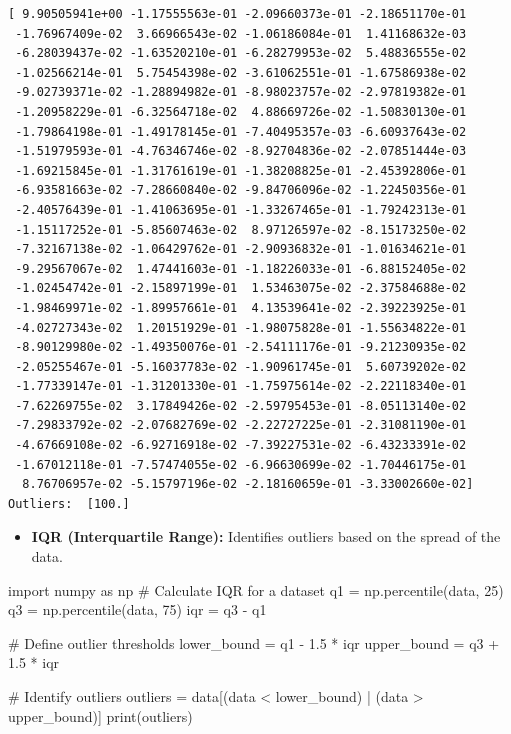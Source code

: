 \documentclass[
  letterpaper,
  DIV=11,
  numbers=noendperiod]{scrreprt}
\newenvironment{Shaded}{\begin{snugshade}}{\end{snugshade}}
\newcommand{\BuiltInTok}[1]{\textcolor[rgb]{0.00,0.23,0.31}{#1}}
\newcommand{\CommentTok}[1]{\textcolor[rgb]{0.37,0.37,0.37}{#1}}
\newcommand{\DecValTok}[1]{\textcolor[rgb]{0.68,0.00,0.00}{#1}}
\newcommand{\FloatTok}[1]{\textcolor[rgb]{0.68,0.00,0.00}{#1}}
\newcommand{\ImportTok}[1]{\textcolor[rgb]{0.00,0.46,0.62}{#1}}
\newcommand{\NormalTok}[1]{\textcolor[rgb]{0.00,0.23,0.31}{#1}}
\newcommand{\OperatorTok}[1]{\textcolor[rgb]{0.37,0.37,0.37}{#1}}
\providecommand{\tightlist}{%
  \setlength{\itemsep}{0pt}\setlength{\parskip}{0pt}}\usepackage{longtable,booktabs,array}
\begin{document}
\begin{verbatim}
[ 9.90505941e+00 -1.17555563e-01 -2.09660373e-01 -2.18651170e-01
 -1.76967409e-02  3.66966543e-02 -1.06186084e-01  1.41168632e-03
 -6.28039437e-02 -1.63520210e-01 -6.28279953e-02  5.48836555e-02
 -1.02566214e-01  5.75454398e-02 -3.61062551e-01 -1.67586938e-02
 -9.02739371e-02 -1.28894982e-01 -8.98023757e-02 -2.97819382e-01
 -1.20958229e-01 -6.32564718e-02  4.88669726e-02 -1.50830130e-01
 -1.79864198e-01 -1.49178145e-01 -7.40495357e-03 -6.60937643e-02
 -1.51979593e-01 -4.76346746e-02 -8.92704836e-02 -2.07851444e-03
 -1.69215845e-01 -1.31761619e-01 -1.38208825e-01 -2.45392806e-01
 -6.93581663e-02 -7.28660840e-02 -9.84706096e-02 -1.22450356e-01
 -2.40576439e-01 -1.41063695e-01 -1.33267465e-01 -1.79242313e-01
 -1.15117252e-01 -5.85607463e-02  8.97126597e-02 -8.15173250e-02
 -7.32167138e-02 -1.06429762e-01 -2.90936832e-01 -1.01634621e-01
 -9.29567067e-02  1.47441603e-01 -1.18226033e-01 -6.88152405e-02
 -1.02454742e-01 -2.15897199e-01  1.53463075e-02 -2.37584688e-02
 -1.98469971e-02 -1.89957661e-01  4.13539641e-02 -2.39223925e-01
 -4.02727343e-02  1.20151929e-01 -1.98075828e-01 -1.55634822e-01
 -8.90129980e-02 -1.49350076e-01 -2.54111176e-01 -9.21230935e-02
 -2.05255467e-01 -5.16037783e-02 -1.90961745e-01  5.60739202e-02
 -1.77339147e-01 -1.31201330e-01 -1.75975614e-02 -2.22118340e-01
 -7.62269755e-02  3.17849426e-02 -2.59795453e-01 -8.05113140e-02
 -7.29833792e-02 -2.07682769e-02 -2.22727225e-01 -2.31081190e-01
 -4.67669108e-02 -6.92716918e-02 -7.39227531e-02 -6.43233391e-02
 -1.67012118e-01 -7.57474055e-02 -6.96630699e-02 -1.70446175e-01
  8.76706957e-02 -5.15797196e-02 -2.18160659e-01 -3.33002660e-02]
Outliers:  [100.]
\end{verbatim}

\begin{itemize}
\tightlist
\item
  \textbf{IQR (Interquartile Range):} Identifies outliers based on the
  spread of the data.
\end{itemize}

\begin{Shaded}
\begin{Highlighting}[]
\ImportTok{import}\NormalTok{ numpy }\ImportTok{as}\NormalTok{ np}
\CommentTok{\# Calculate IQR for a dataset}
\NormalTok{q1 }\OperatorTok{=}\NormalTok{ np.percentile(data, }\DecValTok{25}\NormalTok{)}
\NormalTok{q3 }\OperatorTok{=}\NormalTok{ np.percentile(data, }\DecValTok{75}\NormalTok{)}
\NormalTok{iqr }\OperatorTok{=}\NormalTok{ q3 }\OperatorTok{{-}}\NormalTok{ q1}

\CommentTok{\# Define outlier thresholds}
\NormalTok{lower\_bound }\OperatorTok{=}\NormalTok{ q1 }\OperatorTok{{-}} \FloatTok{1.5} \OperatorTok{*}\NormalTok{ iqr}
\NormalTok{upper\_bound }\OperatorTok{=}\NormalTok{ q3 }\OperatorTok{+} \FloatTok{1.5} \OperatorTok{*}\NormalTok{ iqr}

\CommentTok{\# Identify outliers}
\NormalTok{outliers }\OperatorTok{=}\NormalTok{ data[(data }\OperatorTok{\textless{}}\NormalTok{ lower\_bound) }\OperatorTok{|}\NormalTok{ (data }\OperatorTok{\textgreater{}}\NormalTok{ upper\_bound)]}
\BuiltInTok{print}\NormalTok{(outliers)}
\end{Highlighting}
\end{Shaded}
\end{document}

